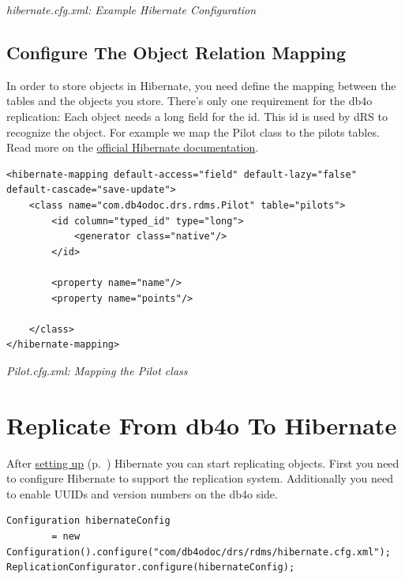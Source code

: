 {\small\itshape hibernate.cfg.xml: Example Hibernate Configuration\par}
\medskip

\subsection*{Configure The Object Relation Mapping}

In order to store objects in Hibernate, you need define the mapping between the tables and the objects you store. There's only one requirement for the db4o replication: Each object needs a long field for the id. This id is used by dRS to recognize the object. For example we map the Pilot class to the pilots tables. Read more on the \href{https://hibernate.org/orm/documentation/}{official Hibernate documentation}.

\begin{lstlisting}
<hibernate-mapping default-access="field" default-lazy="false" default-cascade="save-update">
    <class name="com.db4odoc.drs.rdms.Pilot" table="pilots">
        <id column="typed_id" type="long">
            <generator class="native"/>
        </id>

        <property name="name"/>
        <property name="points"/>

    </class>
</hibernate-mapping>
\end{lstlisting}

{\small\itshape Pilot.cfg.xml: Mapping the Pilot class\par}
\medskip

\section{Replicate From db4o To Hibernate}
\label{drs:db4o-replication-system-drs-db4o-rdbms-db4o-to-rdbms}

After \hyperref[drs:db4o-replication-system-drs-db4o-rdbms-getting-started]{setting up} (p.~\pageref{drs:db4o-replication-system-drs-db4o-rdbms-getting-started}) Hibernate you can start replicating objects. First you need to configure Hibernate to support the replication system. Additionally you need to enable UUIDs and version numbers on the db4o side.

\begin{lstlisting}
Configuration hibernateConfig
        = new Configuration().configure("com/db4odoc/drs/rdms/hibernate.cfg.xml");
ReplicationConfigurator.configure(hibernateConfig);
\end{lstlisting}

